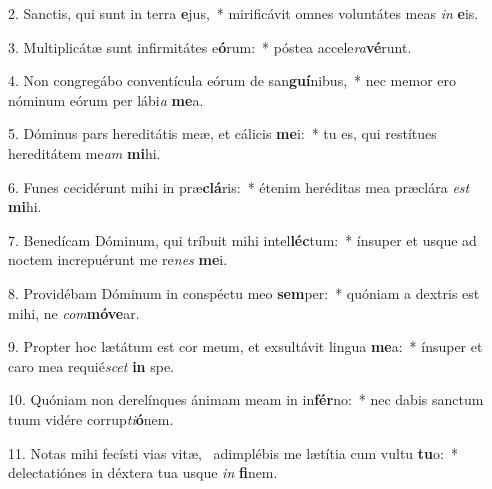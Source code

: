 2. Sanctis, qui sunt in terra \textbf{e}jus,~*  mirificávit omnes voluntátes meas \textit{in} \textbf{e}is.\

3. Multiplicátæ sunt infirmitátes e\textbf{ó}rum:~*  póstea accele\textit{ra}\textbf{vé}runt.\

4. Non congregábo conventícula eórum de san\textbf{guí}nibus,~*  nec memor ero nóminum eórum per lábi\textit{a} \textbf{me}a.\

5. Dóminus pars hereditátis meæ, et cálicis \textbf{me}i:~*  tu es, qui restítues hereditátem me\textit{am} \textbf{mi}hi.\

6. Funes cecidérunt mihi in præ\textbf{clá}ris:~*  étenim heréditas mea præclára \textit{est} \textbf{mi}hi.\

7. Benedícam Dóminum, qui tríbuit mihi intel\textbf{léc}tum:~*  ínsuper et usque ad noctem increpuérunt me re\textit{nes} \textbf{me}i.\

8. Providébam Dóminum in conspéctu meo \textbf{sem}per:~*  quóniam a dextris est mihi, ne \textit{com}\textbf{mó}\textbf{ve}ar.\

9. Propter hoc lætátum est cor meum, et exsultávit lingua \textbf{me}a:~*  ínsuper et caro mea requié\textit{scet} \textbf{in} spe.\

10. Quóniam non derelínques ánimam meam in in\textbf{fér}no:~*  nec dabis sanctum tuum vidére corrup\textit{ti}\textbf{ó}nem.\

11. Notas mihi fecísti vias vitæ, \dag\  adimplébis me lætítia cum vultu \textbf{tu}o:~*  delectatiónes in déxtera tua usque \textit{in} \textbf{fi}nem.\

